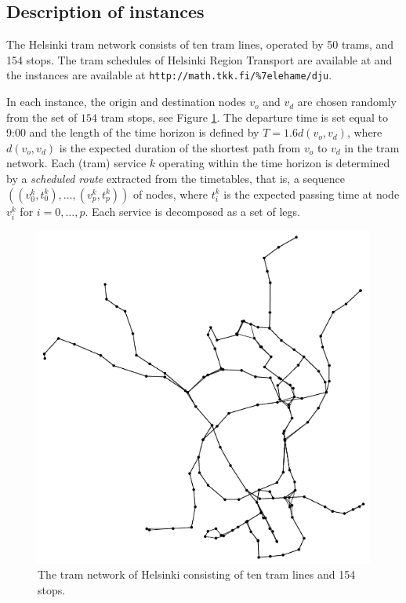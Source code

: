 \documentclass[dissertation,draft*]{aaltoseries}
\begin{document}
\subsection{Description of instances}
\label{reallife}
The Helsinki tram network consists of ten tram lines, operated by 50 trams, and 154 stops. 
The tram schedules of Helsinki Region Transport are available at \cite{reittiopas} and
the instances are available at \verb=http://math.tkk.fi/%7elehame/dju=.

In each instance, the origin and destination nodes $v_o$ and $v_d$ are chosen randomly from the 
set of $154$ tram stops, see Figure \ref{verkot01}. 
The departure time is set equal to 9:00 and the length of the time horizon
is defined by $T = 1.6 d(v_o,v_d)$, where $d(v_o,v_d)$ is the expected duration of the shortest path from $v_o$ to $v_d$ 
in the tram network.
Each (tram) service $k$ operating within the time horizon is determined by a \emph{scheduled route} extracted from the timetables, that is, 
a sequence $((v_0^k,t_0^k),\ldots,(v_p^k,t_p^k))$ of 
nodes, where $t_i^k$ is the expected passing time at node $v_i^k$ 
for $i=0,\ldots,p$. Each service is
decomposed as a set of legs.

\begin{figure}[ht]
\begin{center}
\includegraphics[width=0.7\columnwidth]{verkot01a}
\end{center}
\caption{The tram network of Helsinki consisting of ten tram lines and 154 stops. 
}
\label{verkot01}
\end{figure}

\end{document}
